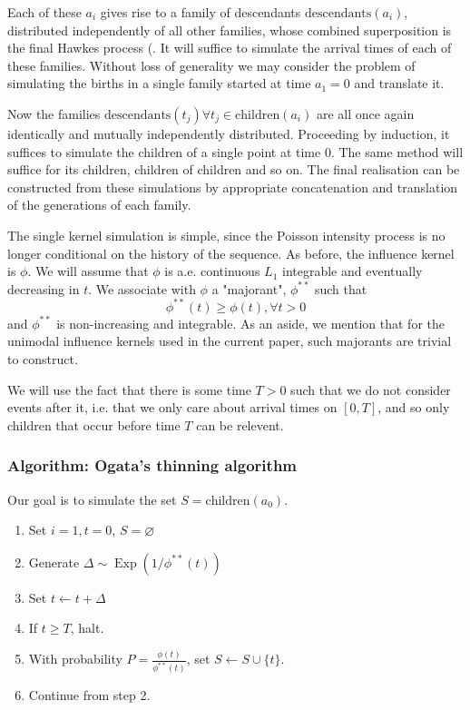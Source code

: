 \documentclass[11pt]{article}
\providecommand{\tightlist}{%
      \setlength{\itemsep}{0pt}\setlength{\parskip}{0pt}}
\begin{document}
Each of these \(a_i\) gives rise to a family of descendants
\(\mathrm{descendants}(a_i)\), distributed independently of all other
families, whose combined superposition is the final Hawkes process
(\cite{hawkes_cluster_1974}. It will suffice to simulate the arrival
times of each of these families. Without loss of generality we may
consider the problem of simulating the births in a single family started
at time \(a_1=0\) and translate it.

Now the families
\(\mathrm{descendants}(t_j)\forall t_j\in \mathrm{children}(a_i)\) are
all once again identically and mutually independently distributed.
Proceeding by induction, it suffices to simulate the children of a
single point at time \(0\). The same method will suffice for its
children, children of children and so on. The final realisation can be
constructed from these simulations by appropriate concatenation and
translation of the generations of each family.

The single kernel simulation is simple, since the Poisson intensity
process is no longer conditional on the history of the sequence. As
before, the influence kernel is \(\phi\). We will assume that \(\phi\)
is a.e. continuous \(L_1\) integrable and eventually decreasing in
\(t\). We associate with \(\phi\) a "majorant", \(\phi^{**}\) such that
\[\phi^{**}(t)\geq\phi(t), \forall t>0\] and \(\phi^{**}\) is
non-increasing and integrable. As an aside, we mention that for the
unimodal influence kernels used in the current paper, such majorants are
trivial to construct.

We will use the fact that there is some time \(T>0\) such that we do not
consider events after it, i.e. that we only care about arrival times on
\([0,T]\), and so only children that occur before time \(T\) can be
relevent.

\subsubsection{Algorithm: Ogata's thinning
algorithm}\label{algorithm-ogatas-thinning-algorithm}

Our goal is to simulate the set \(S=\mathrm{children}(a_0)\).

\begin{enumerate}
\def\labelenumi{\arabic{enumi}.}
\tightlist
\item
  Set \(i=1, t=0\), \(S=\varnothing\)
\item
  Generate \(\Delta\sim \operatorname{Exp}(1/\phi^{**}(t))\)
\item
  Set \(t\leftarrow t+\Delta\)
\item
  If \(t\geq T\), halt.
\item
  With probability \(P=\frac{\phi(t)}{\phi^{**}(t)}\), set
  \(S\leftarrow S\cup \{t\}\).
\item
  Continue from step 2.
\end{enumerate}
\end{document}
